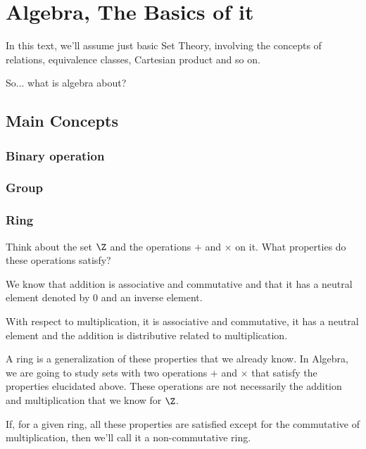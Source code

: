 \documentclass[
]{article}
\author{}
\date{}
\begin{document}
\hypertarget{algebra-the-basics-of-it}{%
\section{Algebra, The Basics of it}\label{algebra-the-basics-of-it}}

In this text, we'll assume just basic Set Theory, involving the concepts
of relations, equivalence classes, Cartesian product and so on.

So... what is algebra about?

\hypertarget{main-concepts}{%
\subsection{Main Concepts}\label{main-concepts}}

\hypertarget{binary-operation}{%
\subsubsection{Binary operation}\label{binary-operation}}

\hypertarget{group}{%
\subsubsection{Group}\label{group}}

\hypertarget{ring}{%
\subsubsection{Ring}\label{ring}}

Think about the set \(\Z\) and the operations \(+\) and \(\times\) on
it. What properties do these operations satisfy?

We know that addition is associative and commutative and that it has a
neutral element denoted by \(0\) and an inverse element.

With respect to multiplication, it is associative and commutative, it
has a neutral element and the addition is distributive related to
multiplication.

A ring is a generalization of these properties that we already know. In
Algebra, we are going to study sets with two operations \(+\) and
\(\times\) that satisfy the properties elucidated above. These
operations are not necessarily the addition and multiplication that we
know for \(\Z\).

If, for a given ring, all these properties are satisfied except for the
commutative of multiplication, then we'll call it a non-commutative
ring.
\end{document}
